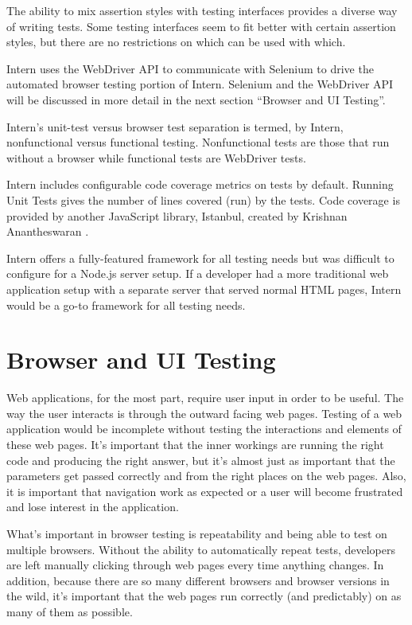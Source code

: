 \documentclass[12pt]{ucthesis}
\begin{document}
The ability to mix assertion styles with testing interfaces provides a diverse way of writing tests. Some testing interfaces seem to fit better with certain assertion styles, but there are no restrictions on which can be used with which.

Intern uses the WebDriver API to communicate with Selenium to drive the automated browser testing portion of Intern. Selenium and the WebDriver API will be discussed in more detail in the next section ``Browser and UI Testing''.

Intern's unit-test versus browser test separation is termed, by Intern, nonfunctional versus functional testing. Nonfunctional tests are those that run without a browser while functional tests are WebDriver tests.

Intern includes configurable code coverage metrics on tests by default. Running Unit Tests gives the number of lines covered (run) by the tests. Code coverage is provided by another JavaScript library, Istanbul, created by Krishnan Anantheswaran \cite{Istanbul}.

Intern offers a fully-featured framework for all testing needs but was difficult to configure for a Node.js server setup. If a developer had a more traditional web application setup with a separate server that served normal HTML pages, Intern would be a go-to framework for all testing needs.

\section{Browser and UI Testing}
Web applications, for the most part, require user input in order to be useful. The way the user interacts is through the outward facing web pages. Testing of a web application would be incomplete without testing the interactions and elements of these web pages. It's important that the inner workings are running the right code and producing the right answer, but it's almost just as important that the parameters get passed correctly and from the right places on the web pages. Also, it is important that navigation work as expected or a user will become frustrated and lose interest in the application.

What's important in browser testing is repeatability and being able to test on multiple browsers. Without the ability to automatically repeat tests, developers are left manually clicking through web pages every time anything changes. In addition, because there are so many different browsers and browser versions in the wild, it's important that the web pages run correctly (and predictably) on as many of them as possible.
\end{document}
